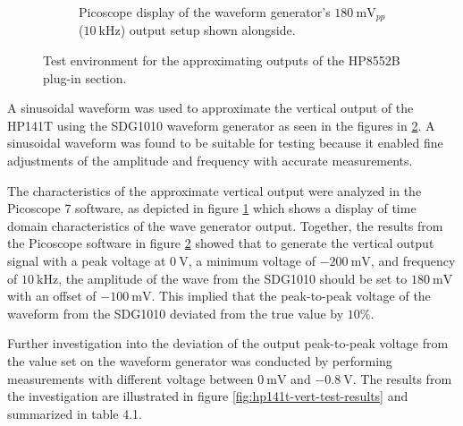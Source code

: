 \documentclass[class=report,11pt,crop=false]{standalone}
\begin{document}
\begin{figure}[h!]
\begin{subfigure}{.33\textwidth}
			\caption{Picoscope display of the waveform generator's $\SI{180}{\milli\volt}_{pp}$ ($\SI{10}{\kilo\hertz}$) output setup shown alongside.}
			\label{fig:hp141t-002Vpp}
		\end{subfigure}
		\caption{Test environment for the approximating outputs of the HP8552B plug-in section.}
		\label{fig:hp141t-test-hardware}
	\end{figure} 

	A sinusoidal waveform was used to approximate the vertical output of the HP141T using the SDG1010 waveform generator as seen in the figures in \ref{fig:hp141t-test-hardware}. A sinusoidal waveform was found to be suitable for testing because it enabled fine adjustments of the amplitude and frequency with accurate measurements. 
	
	The characteristics of the approximate vertical output were analyzed in the Picoscope 7 software, as depicted in figure \ref{fig:hp141t-002Vpp} which shows a display of time domain characteristics of the wave generator output. Together, the results from the Picoscope software in figure \ref{fig:hp141t-test-hardware} showed that to generate the vertical output signal with a peak voltage at $\SI{0}{\volt}$, a minimum voltage of $-\SI{200}{\milli\volt}$, and frequency of $\SI{10}{\kilo\hertz}$, the amplitude of the wave from the SDG1010 should be set to $\SI{180}{\milli\volt}$ with an offset of $-\SI{100}{\milli\volt}$. This implied that the peak-to-peak voltage of the waveform from the SDG1010 deviated from the true value by $10\%$.
	
	Further investigation into the deviation of the output peak-to-peak voltage from the value set on the waveform generator was conducted by performing measurements with different voltage between $\SI{0}{\milli\volt}$ and $-\SI{0.8}{\volt}$. The results from the investigation are illustrated in figure \ref{fig:hp141t-vert-test-results} and summarized in table 4.1. 
	
\end{document}
